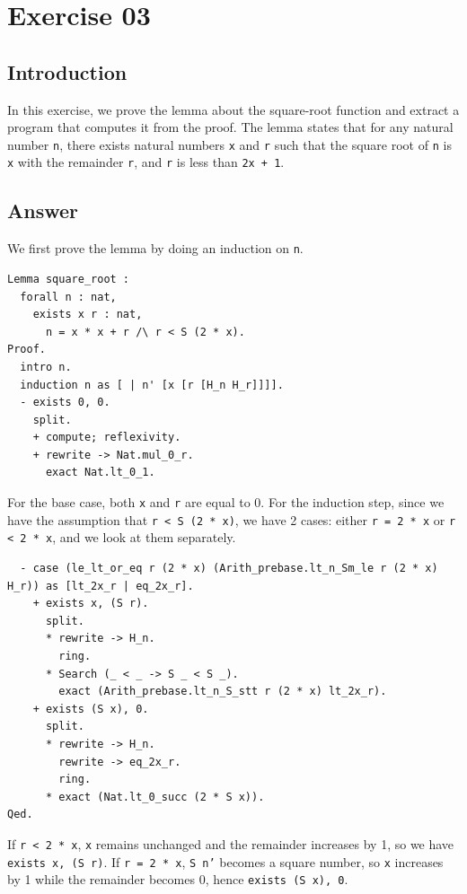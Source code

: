 \documentclass{article}
\begin{document}
\section{Exercise 03}

\subsection{Introduction}
In this exercise, we prove the lemma about the square-root function and extract a program that computes it from the proof. The lemma states that for any natural number \texttt{n}, there exists natural numbers \texttt{x} and \texttt{r} such that the square root of \texttt{n} is \texttt{x} with the remainder \texttt{r}, and \texttt{r} is less than \texttt{2x + 1}.

\subsection{Answer}
We first prove the lemma by doing an induction on \texttt{n}.

\begin{lstlisting}
Lemma square_root :
  forall n : nat,
    exists x r : nat,
      n = x * x + r /\ r < S (2 * x).
Proof.
  intro n.
  induction n as [ | n' [x [r [H_n H_r]]]].
  - exists 0, 0.
    split.
    + compute; reflexivity.
    + rewrite -> Nat.mul_0_r.
      exact Nat.lt_0_1.
\end{lstlisting}

For the base case, both \texttt{x} and \texttt{r} are equal to 0. For the induction step, since we have the assumption that \texttt{r < S (2 * x)}, we have 2 cases: either \texttt{r = 2 * x} or \texttt{r < 2 * x}, and we look at them separately.

\begin{lstlisting}
  - case (le_lt_or_eq r (2 * x) (Arith_prebase.lt_n_Sm_le r (2 * x) H_r)) as [lt_2x_r | eq_2x_r].
    + exists x, (S r).
      split.
      * rewrite -> H_n.
        ring.
      * Search (_ < _ -> S _ < S _).
        exact (Arith_prebase.lt_n_S_stt r (2 * x) lt_2x_r).
    + exists (S x), 0.
      split.
      * rewrite -> H_n.
        rewrite -> eq_2x_r.
        ring.
      * exact (Nat.lt_0_succ (2 * S x)).
Qed.
\end{lstlisting}

If \texttt{r < 2 * x}, \texttt{x} remains unchanged and the remainder increases by 1, so we have \texttt{exists x, (S r)}. If \texttt{r = 2 * x}, \texttt{S n'} becomes a square number, so 
\texttt{x} increases by 1 while the remainder becomes 0, hence \texttt{exists (S x), 0}. 
\end{document}
